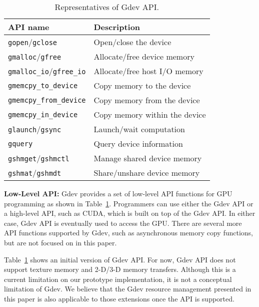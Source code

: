 \begin{table}[t]
 \caption{Representatives of Gdev API.}
 \label{tab:gdev_api}
 \begin{center}
  {\small
  \begin{tabular}{|l|l|}
   \hline
   \textbf{API name} & \textbf{Description}\\
   \hline
   \texttt{gopen}/\texttt{gclose} & Open/close the device\\
   \hline
   \texttt{gmalloc}/\texttt{gfree} & Allocate/free device memory\\
   \hline
   \texttt{gmalloc\_io}/\texttt{gfree\_io} & Allocate/free host I/O memory\\
   \hline
   \texttt{gmemcpy\_to\_device} & Copy memory to the device\\
   \hline
   \texttt{gmemcpy\_from\_device} & Copy memory from the device\\
   \hline
   \texttt{gmemcpy\_in\_device} & Copy memory within the device\\
   \hline
   \texttt{glaunch}/\texttt{gsync} & Launch/wait computation\\
   \hline
   \texttt{gquery} & Query device information\\
   \hline
   \texttt{gshmget}/\texttt{gshmctl} & Manage shared device memory\\
   \hline
   \texttt{gshmat}/\texttt{gshmdt} & Share/unshare device memory\\
   \hline
  \end{tabular}
  }
 \end{center}
\vspace{-1em}
\end{table}

\textbf{Low-Level API:}
Gdev provides a set of low-level API functions for GPU programming as
shown in Table~\ref{tab:gdev_api}.
Programmers can use either the Gdev API or a high-level API, such as
CUDA, which is built on top of the Gdev API.
In either case, Gdev API is eventually used to access the GPU.
There are several more API functions supported by Gdev, such as
asynchronous memory copy functions, but are not focused on in this
paper.

Table~\ref{tab:gdev_api} shows an initial version of Gdev API.
For now, Gdev API does not support texture memory and 2-D/3-D memory
transfers.
Although this is a current limitation on our prototype implementation,
it is not a conceptual limitation of Gdev.
We believe that the Gdev resource management presented in this paper is
also applicable to those extensions once the API is supported.

